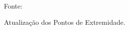 \documentclass[xcolor=dvipsnames, aspectratio=169]{beamer}
\begin{document}
\begin{frame}
\begin{itemize}
\begin{figure}
        \begin{minipage}{0.25\textwidth}
            \centering
            {Fonte: \cite{moutarlier2006experimental}}
            \caption{Atualização dos Pontos de Extremidade.}
            \label{fig:7}
        \end{minipage}
    \end{figure}

  \end{itemize}
\end{frame}
  

\end{document}
